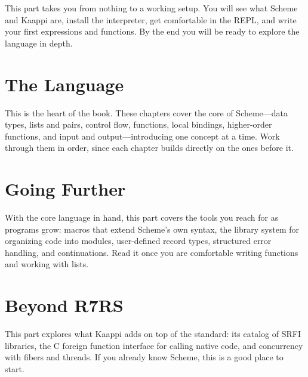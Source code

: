 \documentclass[11pt,twoside,openright]{memoir}
\begin{document}
This part takes you from nothing to a working setup. You will see what Scheme and Kaappi are, install the interpreter, get comfortable in the REPL, and write your first expressions and functions. By the end you will be ready to explore the language in depth.





\part{The Language}

This is the heart of the book. These chapters cover the core of Scheme---data types, lists and pairs, control flow, functions, local bindings, higher-order functions, and input and output---introducing one concept at a time. Work through them in order, since each chapter builds directly on the ones before it.









\part{Going Further}

With the core language in hand, this part covers the tools you reach for as programs grow: macros that extend Scheme's own syntax, the library system for organizing code into modules, user-defined record types, structured error handling, and continuations. Read it once you are comfortable writing functions and working with lists.







\part{Beyond R7RS}

This part explores what Kaappi adds on top of the standard: its catalog of SRFI libraries, the C foreign function interface for calling native code, and concurrency with fibers and threads. If you already know Scheme, this is a good place to start.
\end{document}
